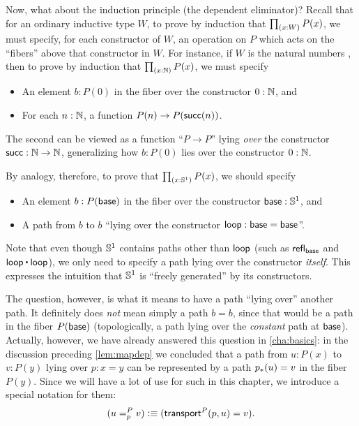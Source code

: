 %
%
Now, what about the induction principle (the dependent eliminator)?
Recall that for an ordinary inductive type $W$, to prove by induction that $\prd{x:W} P(x)$, we must specify, for each constructor of $W$, an operation on $P$ which acts on the ``fibers'' above that constructor in $W$.
For instance, if $W$ is the natural numbers \nat, then to prove by induction that $\prd{x:\nat} P(x)$, we must specify
\begin{itemize}
\item An element $b:P(0)$ in the fiber over the constructor $0:\mathbb{N}$, and
\item For each $n:\mathbb{N}$, a function $P(n) \to P(\mathsf{succ}(n))$.
\end{itemize}
The second can be viewed as a function ``$P\to P$'' lying \emph{over} the constructor $\mathsf{succ}:\mathbb{N}\to\mathbb{N}$, generalizing how $b:P(0)$ lies over the constructor $0:\mathbb{N}$.

By analogy, therefore, to prove that $\prd{x:\Sn^1} P(x)$, we should specify
\begin{itemize}
\item An element $b:P(\mathsf{base})$ in the fiber over the constructor $\mathsf{base}:\mathbb{S}^1$, and
\item A path from $b$ to $b$ ``lying over the constructor $\mathsf{loop}:\mathsf{base}=\mathsf{base}$''.
\end{itemize}
Note that even though $\mathbb{S}^1$ contains paths other than $\mathsf{loop}$ (such as $\mathsf{refl}_{\mathsf{base}}$ and $\lloop\ct\lloop$), we only need to specify a path lying over the constructor \emph{itself}.
This expresses the intuition that $\mathbb{S}^1$ is ``freely generated'' by its constructors.

The question, however, is what it means to have a path ``lying over'' another path.
It definitely does \emph{not} mean simply a path $b=b$, since that would be a path in the fiber $P(\mathsf{base})$ (topologically, a path lying over the \emph{constant} path at $\mathsf{base}$).
Actually, however, we have already answered this question in \cref{cha:basics}: in the discussion preceding \cref{lem:mapdep} we concluded that a path from $u:P(x)$ to $v:P(y)$ lying over $p:x=y$ can be represented by a path ${p}_{*}\mathopen{}\left({u}\right)\mathclose{} = v$ in the fiber $P(y)$.
Since we will have a lot of use for such 
%
in this chapter, we introduce a special notation for them:
\begin{equation}
  (\dpath P p u v) \defeq (\transfib{P} p u = v).\label{eq:dpath}
\end{equation}

